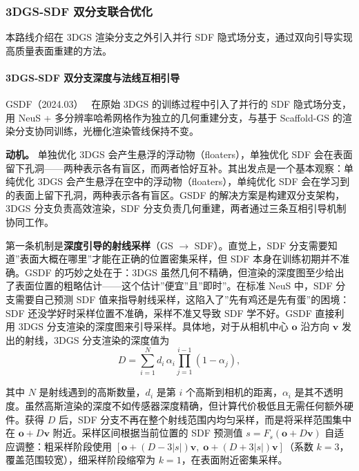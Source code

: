 \subsubsection{3DGS-SDF 双分支联合优化}
\label{subsec:04_2_2}

本路线介绍在 3DGS 渲染分支之外引入并行 SDF 隐式场分支，通过双向引导实现高质量表面重建的方法。

\paragraph{3DGS-SDF 双分支深度与法线互相引导}

GSDF（2024.03）~\cite{2403_16964} 在原始 3DGS 的训练过程中引入了并行的 SDF 隐式场分支，用 NeuS + 多分辨率哈希网格作为独立的几何重建分支，与基于 Scaffold-GS 的渲染分支协同训练，光栅化渲染管线保持不变。

\textbf{动机。} 单独优化 3DGS 会产生悬浮的浮动物（floaters），单独优化 SDF 会在表面留下孔洞——两种表示各有盲区，而两者恰好互补。其出发点是一个基本观察：单纯优化 3DGS 会产生悬浮在空中的浮动物（floaters），单纯优化 SDF 会在学习到的表面上留下孔洞，两种表示各有盲区。GSDF 的解决方案是构建双分支架构，3DGS 分支负责高效渲染，SDF 分支负责几何重建，两者通过三条互相引导机制协同工作。

第一条机制是\textbf{深度引导的射线采样}（GS $\to$ SDF）。直觉上，SDF 分支需要知道”表面大概在哪里”才能在正确的位置密集采样，但 SDF 本身在训练初期并不准确。GSDF 的巧妙之处在于：3DGS 虽然几何不精确，但渲染的深度图至少给出了表面位置的粗略估计——这个估计”便宜”且”即时”。在标准 NeuS 中，SDF 分支需要自己预测 SDF 值来指导射线采样，这陷入了”先有鸡还是先有蛋”的困境：SDF 还没学好时采样位置不准确，采样不准又导致 SDF 学不好。GSDF 直接利用 3DGS 分支渲染的深度图来引导采样。具体地，对于从相机中心 $\mathbf{o}$ 沿方向 $\mathbf{v}$ 发出的射线，3DGS 分支渲染的深度值为
\begin{equation}
    D = \sum_{i=1}^{N} d_i \, \alpha_i \prod_{j=1}^{i-1}(1 - \alpha_j),
\end{equation}

其中 $N$ 是射线遇到的高斯数量，$d_i$ 是第 $i$ 个高斯到相机的距离，$\alpha_i$ 是其不透明度。虽然高斯渲染的深度不如传感器深度精确，但计算代价极低且无需任何额外硬件。获得 $D$ 后，SDF 分支不再在整个射线范围内均匀采样，而是将采样范围集中在 $\mathbf{o} + D\mathbf{v}$ 附近。采样区间根据当前位置的 SDF 预测值 $s = F_s(\mathbf{o} + D\mathbf{v})$ 自适应调整：粗采样阶段使用 $[\mathbf{o} + (D - 3|s|)\mathbf{v}, \; \mathbf{o} + (D + 3|s|)\mathbf{v}]$（系数 $k=3$，覆盖范围较宽），细采样阶段缩窄为 $k=1$，在表面附近密集采样。


